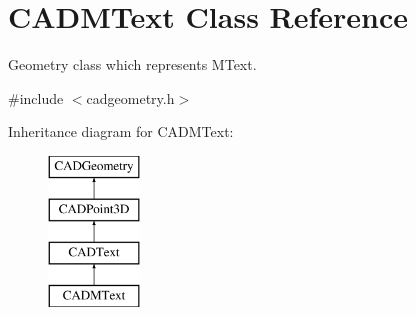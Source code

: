 \hypertarget{class_c_a_d_m_text}{}\section{C\+A\+D\+M\+Text Class Reference}
\label{class_c_a_d_m_text}


Geometry class which represents M\+Text.  




{\ttfamily \#include $<$cadgeometry.\+h$>$}

Inheritance diagram for C\+A\+D\+M\+Text\+:\begin{figure}[H]
\begin{center}
\leavevmode
\includegraphics[height=4.000000cm]{class_c_a_d_m_text}
\end{center}
\end{figure}
